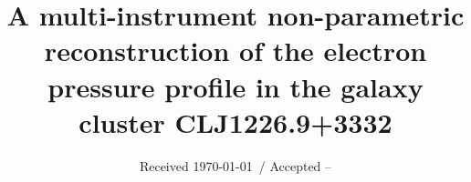 \documentclass[twocolumn,traditabstract]{aa}
\begin{document}
\title{A multi-instrument non-parametric reconstruction of the electron pressure profile in the
  galaxy cluster CLJ1226.9+3332}


\date{Received \today \ / Accepted --}




\end{document}
